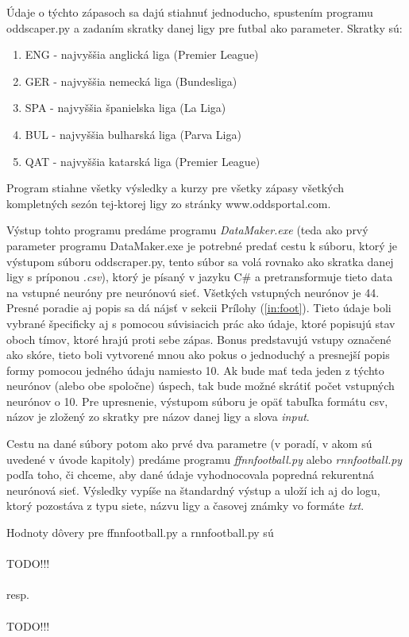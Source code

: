 Údaje o týchto zápasoch sa dajú stiahnuť jednoducho, spustením programu oddscaper.py a zadaním skratky danej ligy pre futbal ako parameter.
Skratky sú:
\begin{enumerate}
\item ENG - najvyššia anglická liga (Premier League)
\item GER - najvyššia nemecká liga (Bundesliga)
\item SPA - najvyššia španielska liga (La Liga)
\item BUL - najvyššia bulharská liga (Parva Liga)
\item QAT - najvyššia katarská liga (Premier League)
\end{enumerate}

Program stiahne všetky výsledky a kurzy pre všetky zápasy všetkých kompletných sezón tej-ktorej ligy zo stránky www.oddsportal.com.

Výstup tohto programu predáme programu \textit{DataMaker.exe} (teda ako prvý parameter programu DataMaker.exe je potrebné predať cestu k súboru, ktorý je výstupom súboru oddscraper.py, tento súbor sa volá rovnako ako skratka danej ligy s príponou \textit{.csv}), ktorý je písaný v jazyku C\# a pretransformuje tieto data na vstupné neuróny pre neurónovú sieť. 
Všetkých vstupných neurónov je 44. 
Presné poradie aj popis sa dá nájsť v sekcii Prílohy (\ref{in:foot}).
Tieto údaje boli vybrané špecificky aj s pomocou súvisiacich prác ako údaje, ktoré popisujú stav oboch tímov, ktoré hrajú proti sebe zápas. 
Bonus predstavujú vstupy označené ako skóre, tieto boli vytvorené mnou ako pokus o jednoduchý a presnejší popis formy pomocou jedného údaju namiesto 10.
Ak bude mať teda jeden z týchto neurónov (alebo obe spoločne) úspech, tak bude možné skrátiť počet vstupných neurónov o 10.
Pre upresnenie, výstupom súboru je opäť tabuľka formátu csv, názov je zložený zo skratky pre názov danej ligy a slova \textit{input}.

Cestu na dané súbory potom ako prvé dva parametre (v poradí, v akom sú uvedené v úvode kapitoly) predáme programu \textit{ffnnfootball.py} alebo \textit{rnnfootball.py} podľa toho, či chceme, aby dané údaje vyhodnocovala popredná rekurentná neurónová sieť.
Výsledky vypíše na štandardný výstup a uloží ich aj do logu, ktorý pozostáva z typu siete, názvu ligy a časovej známky vo formáte \textit{txt}.

Hodnoty dôvery pre ffnnfootball.py a rnnfootball.py sú \\\\
TODO!!!\\\\
resp.\\\\
TODO!!!\\\\


